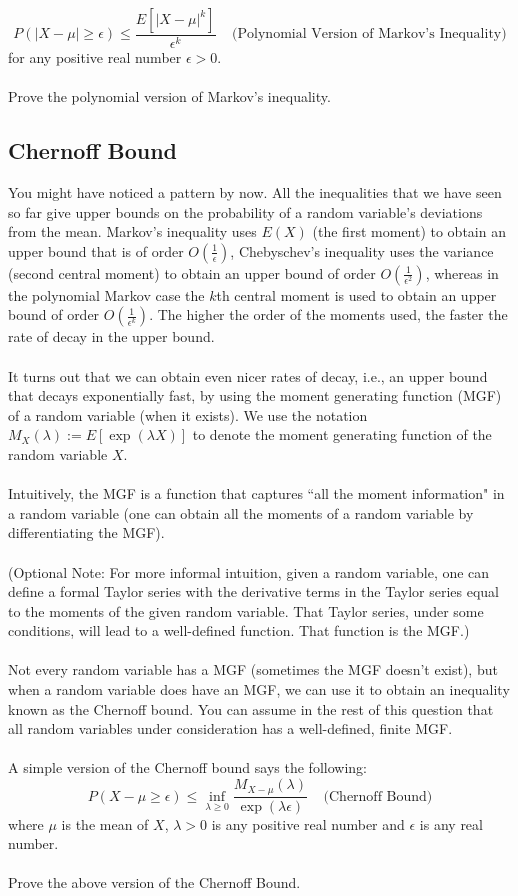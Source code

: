 \documentclass{exam}
\begin{document}
$$P( |X-\mu| \geq \epsilon) \leq \frac{E[|X - \mu|^k]}{\epsilon^k} \;\;\;\; \textrm{(Polynomial Version of Markov's Inequality)}$$
for any positive real number $\epsilon > 0$. 
\\\\
Prove the polynomial version of Markov's inequality. 

\subsection{Chernoff Bound}
You might have noticed a pattern by now. All the inequalities that we have seen so far give upper bounds on the probability of a random variable's deviations from the mean. Markov's inequality uses $E(X)$ (the first moment) to obtain an upper bound that is of order $O(\frac{1}{\epsilon})$, Chebyschev's inequality uses the variance (second central moment) to obtain an upper bound of order $O(\frac{1}{\epsilon^2})$, whereas in the polynomial Markov case the $k$th central moment is used to obtain an upper bound of order $O(\frac{1}{\epsilon^k})$. The higher the order of the moments used, the faster the rate of decay in the upper bound. 
\\\\
It turns out that we can obtain even nicer rates of decay, i.e., an upper bound that decays exponentially fast, by using the moment generating function (MGF) of a random variable (when it exists). We use the notation $M_{X}(\lambda) := E[\exp(\lambda X)]$ to denote the moment generating function of the random variable $X$. 
\\\\Intuitively, the MGF is a function that captures ``all the moment information" in a random variable (one can obtain all the moments of a random variable by differentiating the MGF). \\\\(Optional Note: For more informal intuition, given a random variable, one can define a formal Taylor series with the derivative terms in the Taylor series equal to the moments of the given random variable. That Taylor series, under some conditions, will lead to a well-defined function. That function is the MGF.) \\\\Not every random variable has a MGF (sometimes the MGF doesn't exist), but when a random variable does have an MGF, we can use it to obtain an inequality known as the Chernoff bound. You can assume in the rest of this question that all random variables under consideration has a well-defined, finite MGF. 
\\\\A simple version of the Chernoff bound says the following: 
$$P(X - \mu \geq \epsilon) \leq \inf_{\lambda \geq 0}\frac{M_{X - \mu}(\lambda)}{\exp(\lambda \epsilon)} \;\;\;\; \textrm{(Chernoff Bound)}$$
where $\mu$ is the mean of $X$, $\lambda > 0$ is any positive real number and $\epsilon$ is any real number. 
\\\\Prove the above version of the Chernoff Bound. 
\end{document}
